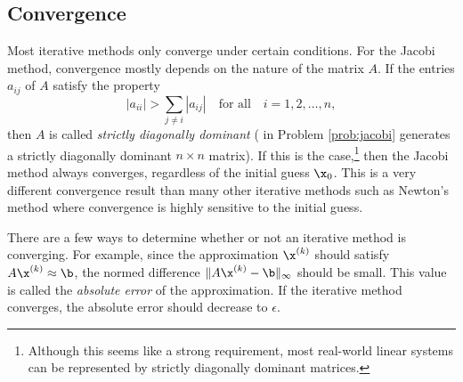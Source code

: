 \subsection*{Convergence} %

Most iterative methods only converge under certain conditions.
For the Jacobi method, convergence mostly depends on the nature of the matrix $A$.
If the entries $a_{ij}$ of $A$ satisfy the property
\[
|a_{ii}| > \sum_{j \neq i} |a_{ij}|\quad \text{for all}\quad i = 1,2,\ldots,n,
\]
then $A$ is called \emph{strictly diagonally dominant} ( in Problem \ref{prob:jacobi} generates a strictly diagonally dominant $n\times n$ matrix).
If this is the case,\footnote{Although this seems like a strong requirement, most real-world linear systems can be represented by strictly diagonally dominant matrices.} then the Jacobi method always converges, regardless of the initial guess $\x_0$.
This is a very different convergence result than many other iterative methods such as Newton's method where convergence is highly sensitive to the initial guess.

There are a few ways to determine whether or not an iterative method is converging.
For example, since the approximation $\x^{(k)}$ should satisfy $A\x^{(k)} \approx \b$, the normed difference $\|A\x^{(k)} - \b\|_\infty$ should be small.
This value is called the \emph{absolute error} of the approximation.
If the iterative method converges, the absolute error should decrease to $\epsilon$.

